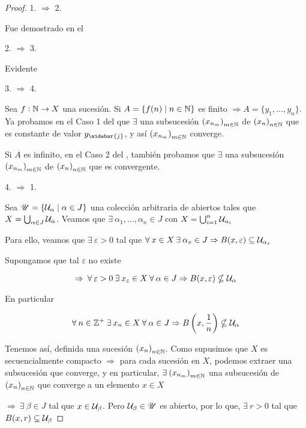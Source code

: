 \begin{proof}
    1. $\Rightarrow$ 2. 

    Fue demostrado en el 

    2. $\Rightarrow$ 3.

    Evidente

    3. $\Rightarrow$ 4. 

    Sea $f : \mathbb{N} \to X$ una sucesión. Si $A = \{ f(n) \mid n \in \mathbb{N} \}$ es finito $\Rightarrow A = \{ y_1, ..., y_n \}$. Ya probamos en el Caso 1 del  que $\exists $ una subsucesión $ {\left( x_{n_m}\right)}_{m \in \mathbb{N}}$ de ${\left( x_n\right)}_{n \in \mathbb{N}}$ que es constante de valor $y_{\widebar{j}}$, y así $ {\left( x_{n_m}\right)}_{m \in \mathbb{N}}$ converge. 
    
    Si $A$ es infinito, en el Caso 2 del , también probamos que $\exists $ una subsucesión $ {\left( x_{n_m}\right)}_{m \in \mathbb{N}}$ de ${\left( x_n\right)}_{n \in \mathbb{N}}$ que es convergente.

    4. $\Rightarrow$ 1. 

    Sea $\mathscr{U} = \{ \mathcal{U}_\alpha \mid \alpha \in J \}$ una colección arbitraria de abiertos tales que $X = \bigcup_{\alpha \in J} \mathcal{U}_\alpha$. Veamos que $\exists \: \alpha_1, ..., \alpha_n \in J$ con $X = \bigcup_{i=1}^{n} \mathcal{U}_{\alpha_i}$

    Para ello, veamos que $\exists \: \varepsilon > 0$ tal que $\forall \: x \in X \: \exists \: \alpha_x \in J \Rightarrow B(x, \varepsilon) \subseteq \mathcal{U}_{\alpha_x}$

    Supongamos que tal $\varepsilon$ no existe

    $$\Rightarrow \: \forall \: \varepsilon > 0 \: \exists \: x_\varepsilon \in X \: \forall \: \alpha \in J \Rightarrow B(x, \varepsilon) \nsubseteq \mathcal{U}_\alpha$$

    En particular

    $$\forall \: n \in \mathbb{Z}^+ \: \exists \: x_n \in X \: \forall \: \alpha \in J \Rightarrow B\left(x, \frac{1}{n} \right) \nsubseteq \mathcal{U}_\alpha$$

    Tenemos así, definida una sucesión ${\left(x_n\right)}_{n \in \mathbb{N}}$. Como supusimos que $X$ es secuencialmente compacto $\Rightarrow$ para cada sucesión en $X$, podemos extraer una subsucesión que converge, y en particular, $\exists \: {\left( x_{n_m}\right)}_{m \in \mathbb{N}}$ una subsucesión de ${\left(x_n\right)}_{n \in \mathbb{N}}$ que converge a un elemento $x \in X$

    $\Rightarrow \: \exists \: \beta \in J$ tal que $x \in \mathcal{U}_\beta$. Pero $\mathcal{U}_\beta \in \mathscr{U}$ es abierto, por lo que, $\exists \: r > 0$ tal que $B(x,r) \subseteq \mathcal{U}_\beta$


\end{proof}
